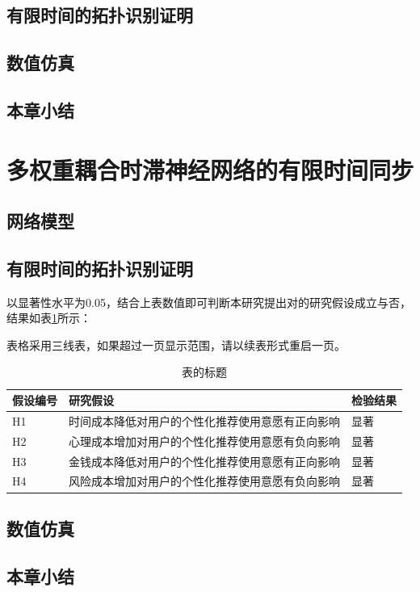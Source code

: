 \documentclass[a4paper,zihao=-4,UTF8]{ctexart}
\numberwithin{equation}{section}
\newcommand{\bold}[2][0.3]{\setBold[#1]#2\unsetBold}
\begin{document}
	\subsection{有限时间的拓扑识别证明}
	\subsection{数值仿真}
	\subsection{本章小结}

\newpage
\section{多权重耦合时滞神经网络的有限时间同步}
	\subsection{网络模型}
	\subsection{有限时间的拓扑识别证明}
	以显著性水平为0.05，结合上表数值即可判断本研究提出对的研究假设成立与否，结果如表\ref{tab:4-1}所示：
	
	表格采用三线表，如果超过一页显示范围，请以续表形式重启一页。
	\begin{table}[h]
		\centering
		\caption{表的标题}
		\label{tab:4-1}
		\begin{tabular}{@{}lll@{}}
			\toprule
			\bold{假设编号} & \textbf{研究假设}            & \bold{检验结果} \\ \midrule
			H1            & 时间成本降低对用户的个性化推荐使用意愿有正向影响 & 显著            \\
			H2            & 心理成本增加对用户的个性化推荐使用意愿有负向影响 & 显著            \\
			H3            & 金钱成本降低对用户的个性化推荐使用意愿有正向影响 & 显著            \\
			H4            & 风险成本增加对用户的个性化推荐使用意愿有负向影响 & 显著            \\ \bottomrule
		\end{tabular}
	\end{table}
	\subsection{数值仿真}
	\subsection{本章小结}
\end{document}
